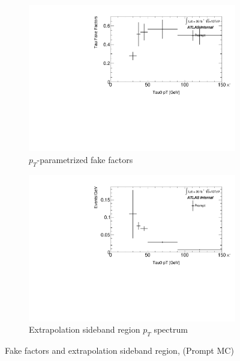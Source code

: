 \documentclass[11pt]{article}
\begin{document}
	\begin{figure}[H]
	\centering
	\begin{subfigure}{.5\textwidth}
	\centering
	\includegraphics[width=0.95\linewidth]{figures/FakesEstimate_data_pp8_nonallhad_new_scaledHists/FF_Faketau_Prompt.pdf}
  	\caption{$p_T$-parametrized fake factors}
  	\label{fig:sub1}
	\end{subfigure}%
	\begin{subfigure}{.5\textwidth}
	\centering
	\includegraphics[width=0.95\linewidth]{figures/FakesEstimate_data_pp8_nonallhad_new_scaledHists/hist_Extrapolation_Prompt.pdf}
	\caption{Extrapolation sideband region $p_T$ spectrum}
	\end{subfigure}
	\caption{Fake factors and extrapolation sideband region, (Prompt MC)}
	\end{figure}
	
\end{document}
